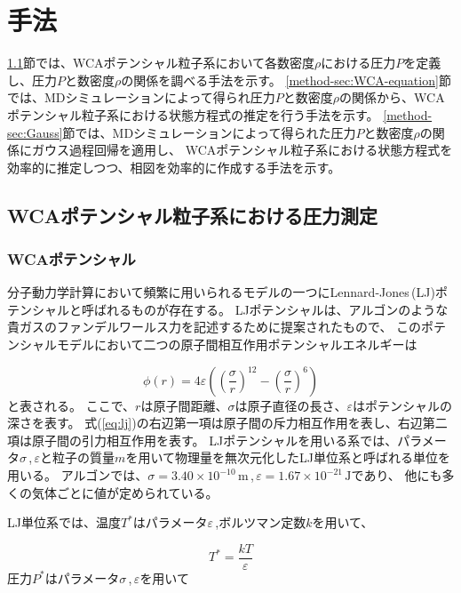 \documentclass[titlepage]{jsreport}
\begin{document}
\chapter{手法} \label{chap:method}
\ref{method-sec:WCA-press}節では、WCAポテンシャル粒子系において各数密度$\rho$における圧力$P$を定義し、圧力$P$と数密度$\rho$の関係を調べる手法を示す。
\ref{method-sec:WCA-equation}節では、MDシミュレーションによって得られ圧力$P$と数密度$\rho$の関係から、WCAポテンシャル粒子系における状態方程式の推定を行う手法を示す。
\ref{method-sec:Gauss}節では、MDシミュレーションによって得られた圧力$P$と数密度$\rho$の関係にガウス過程回帰を適用し、
WCAポテンシャル粒子系における状態方程式を効率的に推定しつつ、相図を効率的に作成する手法を示す。


\section{WCAポテンシャル粒子系における圧力測定}\label{method-sec:WCA-press}

\subsection{WCAポテンシャル}\label{method-subsec:WCA}
分子動力学計算において頻繁に用いられるモデルの一つにLennard-Jones\,(LJ)ポテンシャルと呼ばれるものが存在する。
LJポテンシャルは、アルゴンのような貴ガスのファンデルワールス力を記述するために提案\cite{Lennard_Jones_1931}されたもので、
このポテンシャルモデルにおいて二つの原子間相互作用ポテンシャルエネルギーは

\large
\begin{equation}
\phi(r)=4{\varepsilon}\left(\left(\frac{\sigma}{r}\right)^{12}-\left(\frac{\sigma}{r}\right)^6\right)\label{eq:lj}
\end{equation}
\normalsize
と表される。
ここで、$r$は原子間距離、${\sigma}$は原子直径の長さ、${\varepsilon}$はポテンシャルの深さを表す。
式(\ref{eq:lj})の右辺第一項は原子間の斥力相互作用を表し、右辺第二項は原子間の引力相互作用を表す。
LJポテンシャルを用いる系では、パラメータ$\sigma$\,,\,$\varepsilon$と粒子の質量$m$を用いて物理量を無次元化したLJ単位系と呼ばれる単位を用いる。
アルゴンでは、${\sigma}=3.40×10^{-10}\,\mathrm{m}$\,,\,${\varepsilon}=1.67×10^{-21}\,\mathrm{J}$であり\cite{argon-parameters}、
他にも多くの気体ごとに値が定められている\cite{graphane-parameters,many-parameters}。

\newpage
LJ単位系では、温度$T^*$はパラメータ$\varepsilon$\,,ボルツマン定数$k$を用いて、

\large
\begin{equation}
T^*=\frac{kT}{\varepsilon}\label{eq:T}
\end{equation}
\normalsize
圧力$P^*$はパラメータ${\sigma}$\,,\,${\varepsilon}$を用いて
\end{document}

